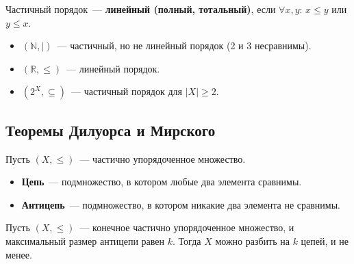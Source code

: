 \documentclass[12pt]{article}
\begin{document}
	\begin{definition}
		Частичный порядок~--- \textbf{линейный (полный, тотальный)}, если $\forall x, y$: $x \leqslant y$ или $y \leqslant x$.
	\end{definition}
	
	\begin{example}
		\begin{itemize}
			\item $(\mathbb{N}, \mid)$~--- частичный, но не линейный порядок (2 и 3 несравнимы).
			\item $(\mathbb{R}, \leqslant)$~--- линейный порядок.
			\item $(2^X, \subseteq)$~--- частичный порядок для $|X| \geqslant 2$.
		\end{itemize}
	\end{example}
	
	\subsection{Теоремы Дилуорса и Мирского}
	
	\begin{definition}
		Пусть $(X, \leqslant)$~--- частично упорядоченное множество.
		\begin{itemize}
			\item \textbf{Цепь}~--- подмножество, в котором любые два элемента сравнимы.
			\item \textbf{Антицепь}~--- подмножество, в котором никакие два элемента не сравнимы.
		\end{itemize}
	\end{definition}
	
	\begin{theorem}[Дилуорс]
		Пусть $(X, \leqslant)$~--- конечное частично упорядоченное множество, и максимальный размер антицепи равен $k$. Тогда $X$ можно разбить на $k$ цепей, и не менее.
	\end{theorem}
	
\end{document}
